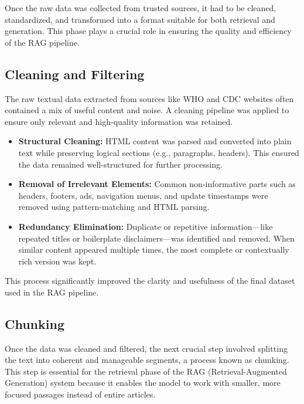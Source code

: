 \label{sec:data-preparation}

Once the raw data was collected from trusted sources, it had to be cleaned, standardized, and transformed into a format suitable for both retrieval and generation. This phase plays a crucial role in ensuring the quality and efficiency of the RAG pipeline.

\subsection{Cleaning and Filtering}
\label{subsec:cleaning-filtering}

The raw textual data extracted from sources like WHO and CDC websites often contained a mix of useful content and noise. A cleaning pipeline was applied to ensure only relevant and high-quality information was retained.

\begin{itemize}
    \item \textbf{Structural Cleaning:} HTML content was parsed and converted into plain text while preserving logical sections (e.g., paragraphs, headers). This ensured the data remained well-structured for further processing.
    
    \item \textbf{Removal of Irrelevant Elements:} Common non-informative parts such as headers, footers, ads, navigation menus, and update timestamps were removed using pattern-matching and HTML parsing.
    
    \item \textbf{Redundancy Elimination:} Duplicate or repetitive information—like repeated titles or boilerplate disclaimers—was identified and removed. When similar content appeared multiple times, the most complete or contextually rich version was kept.
\end{itemize}

This process significantly improved the clarity and usefulness of the final dataset used in the RAG pipeline.

\subsection{Chunking}
\label{subsec:chunking}

Once the data was cleaned and filtered, the next crucial step involved splitting the text into coherent and manageable segments, a process known as chunking. This step is essential for the retrieval phase of the RAG (Retrieval-Augmented Generation) system because it enables the model to work with smaller, more focused passages instead of entire articles.

